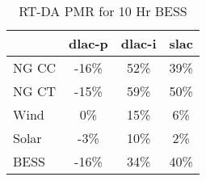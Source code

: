 \begin{table}[htbp]
\centering
\begin{tabular}{lccc}
\toprule
\hline
 & dlac-p & dlac-i & slac \\
\hline
\quad NG CC & -16\% & 52\% & 39\% \\
\quad NG CT & -15\% & 59\% & 50\% \\
\quad Wind & 0\% & 15\% & 6\% \\
\quad Solar & -3\% & 10\% & 2\% \\
\quad BESS & -16\% & 34\% & 40\% \\
\hline
\bottomrule
\end{tabular}
\caption{RT-DA PMR for 10 Hr BESS}
\label{tab:table4_10_Hr_BESS}
\end{table}
